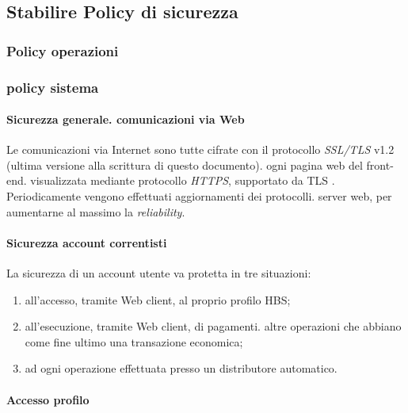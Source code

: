 \subsection{Stabilire Policy di sicurezza}


\subsubsection{Policy operazioni}



\subsubsection{policy sistema}
	\paragraph{Sicurezza generale. comunicazioni via Web}
Le comunicazioni via Internet sono tutte cifrate con il protocollo \emph{SSL/TLS} v1.2 (ultima versione alla scrittura di questo documento). ogni pagina web del front-end. visualizzata mediante protocollo \emph{HTTPS}, supportato da TLS .
\linebreak
Periodicamente vengono effettuati aggiornamenti dei protocolli. server web, per aumentarne al massimo la \emph{reliability}.




	\paragraph{Sicurezza account correntisti}
La sicurezza di un account utente va protetta in tre situazioni:
\begin{enumerate}
\item all'accesso, tramite Web client, al proprio profilo HBS;
\item all'esecuzione, tramite Web client, di pagamenti. altre operazioni che abbiano come fine ultimo una transazione economica;
\item ad ogni operazione effettuata presso un distributore automatico.
\end{enumerate}

\paragraph{Accesso profilo}

